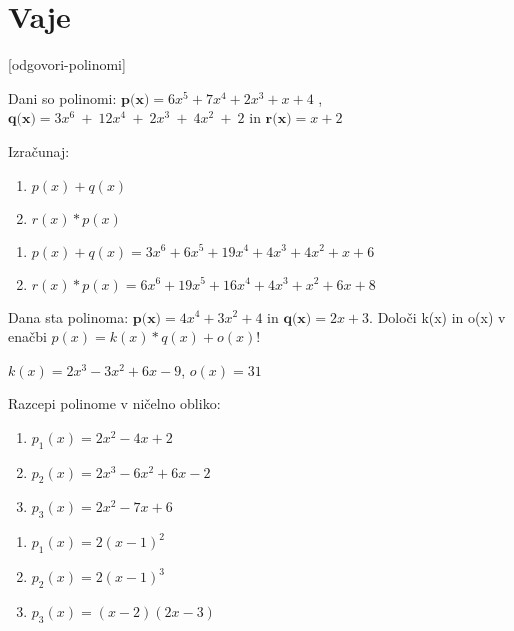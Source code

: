 \section{Vaje}
\label{sec:polinomi-funkcije-vaje}


\def\datotekaOdgovori{odgovori-polinomi}

[\datotekaOdgovori]

%

\begin{vaja}
  Dani so polinomi: $\textbf{p(x)}=6x^5+7x^4+2x^3+x+4$ , 
$\textbf{q(x)}=3x^6~+~12x^4~+~2x^3~+~4x^2~+~2$ in $\textbf{r(x)}=x+2$

Izračunaj: 
\begin{enumerate}
\item $p(x)+q(x)$ 
\item $r(x)*p(x)$
\end{enumerate}

  \begin{odgovor}
\begin{enumerate}
\item $p(x)+q(x)=3x^6+6x^5+19x^4+4x^3+4x^2+x+6$
\item $r(x)*p(x)= 6x^6+19x^5+16x^4+4x^3+x^2+6x+8$
\end{enumerate}
  \end{odgovor}
\end{vaja}

\begin{vaja}
 Dana sta polinoma:  $\textbf{p(x)}=4x^4+3x^2+4$ in $\textbf{q(x)}=2x+3$. Določi k(x) in o(x) v enačbi $p(x)=k(x)*q(x)+o(x)$!

  \begin{odgovor}
    $k(x)=2x^3-3x^2+6x-9$, $ o(x)=31$
  \end{odgovor}
\end{vaja}

\begin{vaja}
 Razcepi polinome v ničelno obliko:
\begin{enumerate}
\item $p_1(x)=2x^2-4x+2$
\item $p_2(x)= 2x^3-6x^2+6x-2$
\item $p_3(x)=2x^2-7x+6$
\end{enumerate}
  \begin{odgovor}
\begin{enumerate}
\item $p_1(x)=2(x-1)^2$
\item $p_2(x)=2(x-1)^3$
\item $p_3(x)=(x-2)(2x-3)$
\end{enumerate}
 \end{odgovor}
\end{vaja}

